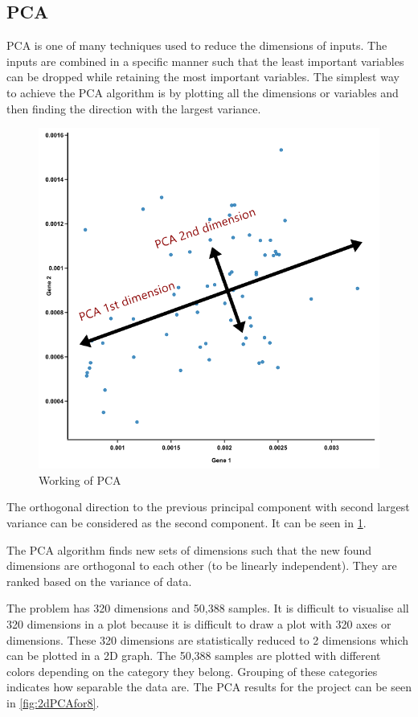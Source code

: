 \documentclass[12pt, a4paper]{article}
\begin{document}
\subsection{\gls{PCA}}
\gls{PCA} is one of many techniques used to reduce the dimensions of inputs. The inputs are combined in a specific manner such that the least important variables can be dropped while retaining the most important variables. The simplest way to achieve the PCA algorithm is by plotting all the dimensions or variables and then finding the direction with the largest variance. \begin{figure}[!ht]
\centering
    \begin{center}
        \includegraphics[width = 13.5 cm]{howPCAworks.png}
    \end{center}
    \caption{Working of PCA}
    \label{fig:howPCAWorks}
\end{figure} The orthogonal direction to the previous principal component with second largest variance can be considered as the second component. It can be seen in \ref{fig:howPCAWorks}.

The \gls{PCA} algorithm finds new sets of dimensions such that the new found dimensions are orthogonal to each other (to be linearly independent). They are ranked based on the variance of data.

The problem has 320 dimensions and 50,388 samples. It is difficult to visualise all 320 dimensions in a plot because it is difficult to draw a plot with 320 axes or dimensions. These 320 dimensions are statistically reduced to 2 dimensions which can be plotted in a 2D graph. The 50,388 samples are plotted with different colors depending on the category they belong. Grouping of these categories indicates how separable the data are. The PCA results for the project can be seen in \ref{fig:2dPCAfor8}.
\end{document}
